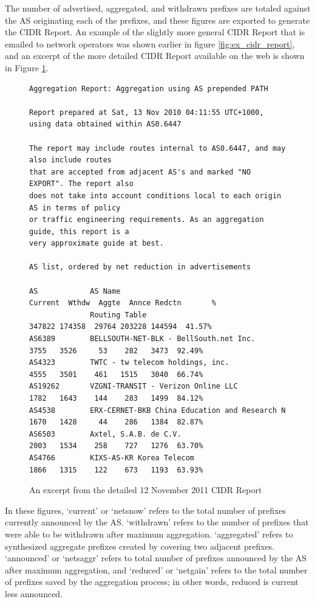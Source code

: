 The number of advertised, aggregated, and withdrawn prefixes are totaled against the AS originating each of the prefixes, and these figures are exported to generate the CIDR Report. An example of the slightly more general CIDR Report that is emailed to network operators was shown earlier in figure \ref{fig:ex_cidr_report}, and an excerpt of the more detailed CIDR Report available on the web is shown in Figure \ref{fig:ex_cidr_report_detail}.

\begin{figure}
\begin{lstlisting}[frame=trlb]
Aggregation Report: Aggregation using AS prepended PATH

Report prepared at Sat, 13 Nov 2010 04:11:55 UTC+1000, using data obtained within AS0.6447

The report may include routes internal to AS0.6447, and may also include routes
that are accepted from adjacent AS's and marked "NO EXPORT". The report also 
does not take into account conditions local to each origin AS in terms of policy
or traffic engineering requirements. As an aggregation guide, this report is a 
very approximate guide at best. 

AS list, ordered by net reduction in advertisements

AS            AS Name                                      Current  Wthdw  Aggte  Annce Redctn       %
              Routing Table                                 347822 174358  29764 203228 144594  41.57%
AS6389        BELLSOUTH-NET-BLK - BellSouth.net Inc.          3755   3526     53    282   3473  92.49%
AS4323        TWTC - tw telecom holdings, inc.                4555   3501    461   1515   3040  66.74%
AS19262       VZGNI-TRANSIT - Verizon Online LLC              1782   1643    144    283   1499  84.12%
AS4538        ERX-CERNET-BKB China Education and Research N   1670   1428     44    286   1384  82.87%
AS6503        Axtel, S.A.B. de C.V.                           2003   1534    258    727   1276  63.70%
AS4766        KIXS-AS-KR Korea Telecom                        1866   1315    122    673   1193  63.93%
\end{lstlisting}
\caption{An excerpt from the detailed 12 November 2011 CIDR Report}
\label{fig:ex_cidr_report_detail}
\end{figure}

In these figures, `current' or `netsnow' refers to the total number of prefixes currently announced by the AS. `withdrawn' refers to the number of prefixes that were able to be withdrawn after maximum aggregation. `aggregated' refers to synthesized aggregate prefixes created by covering two adjacent prefixes. `announced' or `netsaggr' refers to total number of prefixes announced by the AS after maximum aggregation, and `reduced' or `netgain' refers to the total number of prefixes saved by the aggregation process; in other words, reduced is current less announced.

